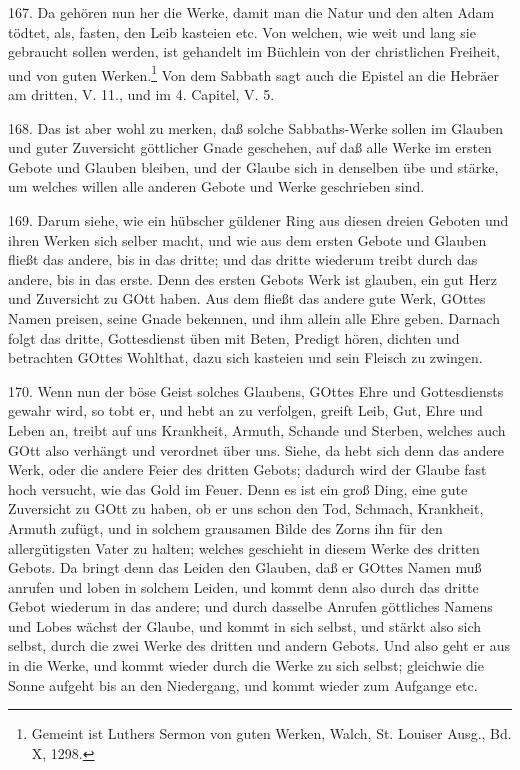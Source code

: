 167. Da gehören nun her die Werke, damit man die Natur und den alten Adam tödtet, als, fasten, den Leib kasteien etc. Von welchen, wie weit und lang sie gebraucht sollen werden, ist gehandelt im Büchlein von der christlichen Freiheit, und von guten Werken.\footnote{Gemeint ist Luthers Sermon von guten Werken, Walch, St. Louiser Ausg., Bd. X, 1298.} Von dem Sabbath sagt auch die Epistel an die Hebräer am dritten, V. 11., und im 4. Capitel, V. 5.

168. Das ist aber wohl zu merken, daß solche Sabbaths-Werke sollen im Glauben und guter Zuversicht göttlicher Gnade geschehen, auf daß alle Werke im ersten Gebote und Glauben bleiben, und der Glaube sich in denselben übe und stärke, um welches willen alle anderen Gebote und Werke geschrieben sind.

169. Darum siehe, wie ein hübscher güldener Ring aus diesen dreien Geboten und ihren Werken sich selber macht, und wie aus dem ersten Gebote und Glauben fließt das andere, bis in das dritte; und das dritte wiederum treibt durch das andere, bis in das erste. Denn des ersten Gebots Werk ist glauben, ein gut Herz und Zuversicht zu GOtt haben. Aus dem fließt das andere gute Werk, GOttes Namen preisen, seine Gnade bekennen, und ihm allein alle Ehre geben. Darnach folgt das dritte, Gottesdienst üben mit Beten, Predigt hören, dichten und betrachten GOttes Wohlthat, dazu sich kasteien und sein Fleisch zu zwingen.

170. Wenn nun der böse Geist solches Glaubens, GOttes Ehre und Gottesdiensts gewahr wird, so tobt er, und hebt an zu verfolgen, greift Leib, Gut, Ehre und Leben an, treibt auf uns Krankheit, Armuth, Schande und Sterben, welches auch GOtt also verhängt und verordnet über uns. Siehe, da hebt sich denn das andere Werk, oder die andere Feier des dritten Gebots; dadurch wird der Glaube fast hoch versucht, wie das Gold im Feuer. Denn es ist ein groß Ding, eine gute Zuversicht zu GOtt zu haben, ob er uns schon den Tod, Schmach, Krankheit, Armuth zufügt, und in solchem grausamen Bilde des Zorns ihn für den allergütigsten Vater zu halten; welches geschieht in diesem Werke des dritten Gebots. Da bringt denn das Leiden den Glauben, daß er GOttes Namen muß anrufen und loben in solchem Leiden, und kommt denn also durch das dritte Gebot wiederum in das andere; und durch dasselbe Anrufen göttliches Namens und Lobes wächst der Glaube, und kommt in sich selbst, und stärkt also sich selbst, durch die zwei Werke des dritten und andern Gebots. Und also geht er aus in die Werke, und kommt wieder durch die Werke zu sich selbst; gleichwie die Sonne aufgeht bis an den Niedergang, und kommt wieder zum Aufgange etc.


